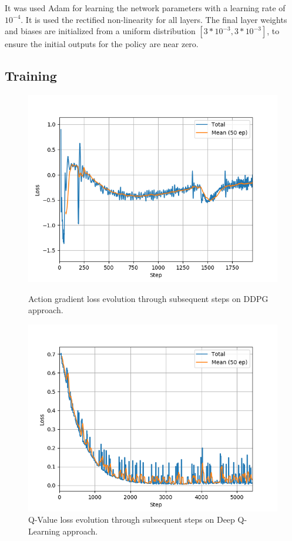 \documentclass[peerreview,onecolumn]{IEEEtran}
\begin{document}
	 It was used Adam \cite{adam_2014} for learning the network parameters with a learning rate of $10^{-4}$. It is used the rectified non-linearity \cite{relu_2011} for all layers. The final layer weights and biases are initialized from a uniform distribution $[3 * 10^{-3}, 3 * 10^{-3}]$, to ensure the initial outputs for the policy are near zero.
	 
	 \subsection{Training}


	 \begin{figure}[t]
\centering
\begin{minipage}{0.4\textwidth}
	\includegraphics[scale=0.5]{img/loss.png}
	\caption{Action gradient loss evolution through subsequent steps on DDPG approach.}
	\label{fig:loss}

	\end{minipage}
	\hspace{0.5cm}
	\begin{minipage}{0.4\textwidth}
		\centering
		\includegraphics[scale=0.5]{img/lossDQN.png}
		\caption{Q-Value loss evolution through subsequent steps on Deep Q-Learning approach.}
		\label{fig:loss_1}
		\centering
	\end{minipage}	
	\end{figure}
	 
\end{document}
